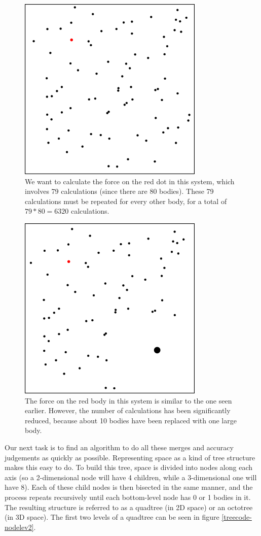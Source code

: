 \documentclass[12pt,twoside]{reedthesis}
\begin{document}
\begin{figure}[p]
	\includegraphics{imgs/treecode-basic}
	\caption{We want to calculate the force on the red dot in this system, which involves 79 calculations (since there are 80 bodies). These 79 calculations must be repeated for every other body, for a total of $79*80=6320$ calculations.}
	\label{treecode-basic}
\end{figure}

\begin{figure}[p]
	\includegraphics{imgs/treecode-merged}
	\caption{The force on the red body in this system is similar to the one seen earlier. However, the number of calculations has been significantly reduced, because about 10 bodies have been replaced with one large body.}
	\label{treecode-merged}
\end{figure}

Our next task is to find an algorithm to do all these merges and accuracy judgements as quickly as possible. Representing space as a kind of tree structure makes this easy to do. To build this tree, space is divided into nodes along each axis (so a 2-dimensional node will have 4 children, while a 3-dimensional one will have 8). Each of these child nodes is then bisected in the same manner, and the process repeats recursively until each bottom-level node has 0 or 1 bodies in it. The resulting structure is referred to as a quadtree (in 2D space) or an octotree (in 3D space). The first two levels of a quadtree can be seen in figure \ref{treecode-nodelev2}.
\end{document}
